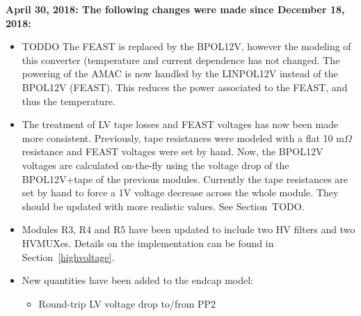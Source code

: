 \documentclass[10pt,]{article}
\begin{document}
{ \bf
April 30, 2018: The following changes were made since December 18, 2018:}
\begin{itemize}
\item TODDO The FEAST is replaced by the BPOL12V, however the modeling of this converter (temperature
  and current dependence has not changed. The powering of the AMAC is now handled by the LINPOL12V
  instead of the BPOL12V (FEAST). This reduces the power associated to the FEAST, and thus the
  temperature.
\item The treatment of LV tape losses and FEAST voltages has now been made more consistent. Previously,
  tape resistances were modeled with a flat 10 m$\Omega$ resistance and FEAST voltages were set by hand.
  Now, the BPOL12V voltages are calculated on-the-fly using the voltage drop of the BPOL12V+tape of
  the previous modules. Currently the tape resistances are set by hand to force a 1V voltage decrease
  across the whole module. They should be updated with more realistic values. See Section~TODO.
\item Modules R3, R4 and R5 have been updated to include two HV filters and two HVMUXes. Details on the
implementation can be found in Section~\ref{highvoltage}.
\item New quantities have been added to the endcap model:
  \begin{itemize}
    \item Round-trip LV voltage drop to/from PP2
  \end{itemize}
\end{itemize}




\clearpage

\clearpage


\clearpage

\clearpage

\clearpage
\begin{appendices}

\end{appendices}
\end{document}
